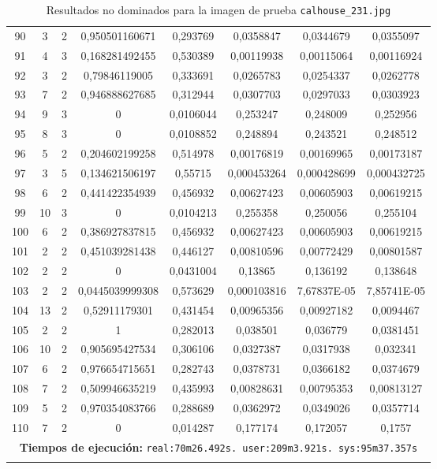 \begin{longtable}{|c|c|c|c|c|c|c|c|}
90 & 3 & 2 & 0,950501160671 & 0,293769 & 0,0358847 & 0,0344679 & 0,0355097  \\
91 & 4 & 3 & 0,168281492455 & 0,530389 & 0,00119938 & 0,00115064 & 0,00116924  \\
92 & 3 & 2 & 0,79846119005 & 0,333691 & 0,0265783 & 0,0254337 & 0,0262778  \\
93 & 7 & 2 & 0,946888627685 & 0,312944 & 0,0307703 & 0,0297033 & 0,0303923  \\
94 & 9 & 3 & 0 & 0,0106044 & 0,253247 & 0,248009 & 0,252956  \\
95 & 8 & 3 & 0 & 0,0108852 & 0,248894 & 0,243521 & 0,248512  \\
96 & 5 & 2 & 0,204602199258 & 0,514978 & 0,00176819 & 0,00169965 & 0,00173187  \\
97 & 3 & 5 & 0,134621506197 & 0,55715 & 0,000453264 & 0,000428699 & 0,000432725  \\
98 & 6 & 2 & 0,441422354939 & 0,456932 & 0,00627423 & 0,00605903 & 0,00619215  \\
99 & 10 & 3 & 0 & 0,0104213 & 0,255358 & 0,250056 & 0,255104  \\
100 & 6 & 2 & 0,386927837815 & 0,456932 & 0,00627423 & 0,00605903 & 0,00619215  \\
101 & 2 & 2 & 0,451039281438 & 0,446127 & 0,00810596 & 0,00772429 & 0,00801587  \\
102 & 2 & 2 & 0 & 0,0431004 & 0,13865 & 0,136192 & 0,138648  \\
103 & 2 & 2 & 0,0445039999308 & 0,573629 & 0,000103816 & 7,67837E-05 & 7,85741E-05  \\
104 & 13 & 2 & 0,52911179301 & 0,431454 & 0,00965356 & 0,00927182 & 0,0094467  \\
105 & 2 & 2 & 1 & 0,282013 & 0,038501 & 0,036779 & 0,0381451  \\
106 & 10 & 2 & 0,905695427534 & 0,306106 & 0,0327387 & 0,0317938 & 0,032341  \\
107 & 6 & 2 & 0,976654715651 & 0,282743 & 0,0378731 & 0,0366182 & 0,0374679  \\
108 & 7 & 2 & 0,509946635219 & 0,435993 & 0,00828631 & 0,00795353 & 0,00813127  \\
109 & 5 & 2 & 0,970354083766 & 0,288689 & 0,0362972 & 0,0349026 & 0,0357714  \\
110 & 7 & 2 & 0 & 0,014287 & 0,177174 & 0,172057 & 0,1757  \\
\hline
\multicolumn{8}{|c|}{\textbf{Tiempos de ejecución:} \texttt{real:70m26.492s. user:209m3.921s. sys:95m37.357s}}\\  \hline
\caption{Resultados no dominados para la imagen de prueba \texttt{calhouse\_231.jpg}}
\label{tab:calhouse_231}
\end{longtable}
\normalsize

